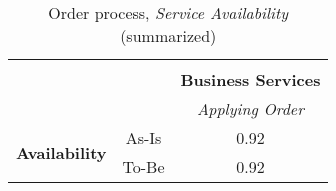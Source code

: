 \begin{table}[H]
\begin{tabular}{|c|c|p{2cm}|p{2.5cm}|p{2.5cm}|p{2.5cm}|}
		\multicolumn{6}{c}{} \\ \cline{3-6}
		\multicolumn{2}{c}{} & \multicolumn{4}{|c|}{\textbf{Business Services}} \\ \cline{3-6}
		\multicolumn{2}{c|}{} &  \multicolumn{4}{c|}{\textsl{Applying Order}}  \\
		\hline
		\multirow{2}{*}{\textbf{Availability}} & As-Is & \multicolumn{4}{c|}{0.92}\\ \cline{2-6}
		& To-Be & \multicolumn{4}{c|}{0.92} \\ \hline
	\end{tabular}
\caption{Order process, \textsl{Service Availability} (summarized)} 
\label{tab:order_as_is}
\end{table}